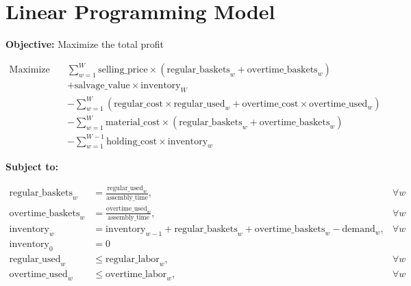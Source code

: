 \documentclass{article}
\begin{document}
\section*{Linear Programming Model}
\textbf{Objective:} Maximize the total profit

\begin{align*}
\text{Maximize} \quad & \sum_{w=1}^{W} \text{selling\_price} \times (\text{regular\_baskets}_w + \text{overtime\_baskets}_w) \\
& + \text{salvage\_value} \times \text{inventory}_W \\
& - \sum_{w=1}^{W} (\text{regular_cost} \times \text{regular\_used}_w + \text{overtime_cost} \times \text{overtime\_used}_w) \\
& - \sum_{w=1}^{W} \text{material_cost} \times (\text{regular\_baskets}_w + \text{overtime\_baskets}_w) \\
& - \sum_{w=1}^{W-1} \text{holding_cost} \times \text{inventory}_w
\end{align*}

\textbf{Subject to:}

\begin{align*}
\text{regular\_baskets}_w &= \frac{\text{regular\_used}_w}{\text{assembly\_time}}, & \forall w \\
\text{overtime\_baskets}_w &= \frac{\text{overtime\_used}_w}{\text{assembly\_time}}, & \forall w \\
\text{inventory}_w &= \text{inventory}_{w-1} + \text{regular\_baskets}_w + \text{overtime\_baskets}_w - \text{demand}_w, & \forall w \\
\text{inventory}_0 &= 0 \\
\text{regular\_used}_w &\leq \text{regular\_labor}_w, & \forall w \\
\text{overtime\_used}_w &\leq \text{overtime\_labor}_w, & \forall w \\
\end{align*}
\end{document}
